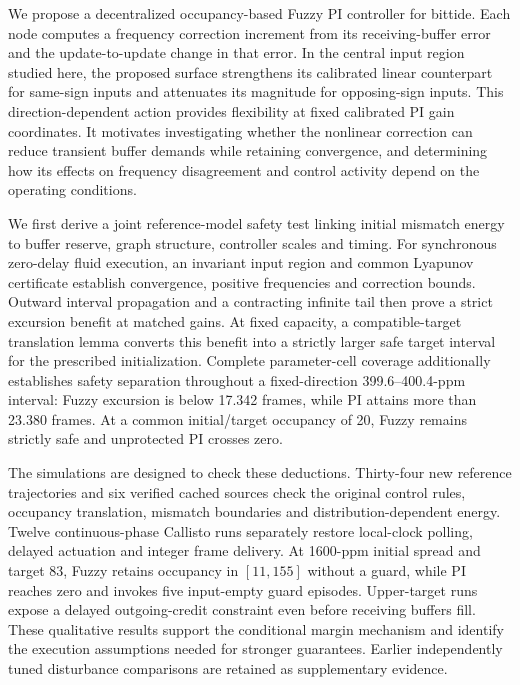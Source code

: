 We propose a decentralized occupancy-based Fuzzy PI controller for bittide. Each node computes a frequency correction increment from its receiving-buffer error and the update-to-update change in that error. In the central input region studied here, the proposed surface strengthens its calibrated linear counterpart for same-sign inputs and attenuates its magnitude for opposing-sign inputs. This direction-dependent action provides flexibility at fixed calibrated PI gain coordinates. It motivates investigating whether the nonlinear correction can reduce transient buffer demands while retaining convergence, and determining how its effects on frequency disagreement and control activity depend on the operating conditions.

We first derive a joint reference-model safety test linking initial mismatch energy to buffer reserve, graph structure, controller scales and timing. For synchronous zero-delay fluid execution, an invariant input region and common Lyapunov certificate establish convergence, positive frequencies and correction bounds. Outward interval propagation and a contracting infinite tail then prove a strict excursion benefit at matched gains. At fixed capacity, a compatible-target translation lemma converts this benefit into a strictly larger safe target interval for the prescribed initialization. Complete parameter-cell coverage additionally establishes safety separation throughout a fixed-direction 399.6--400.4-ppm interval: Fuzzy excursion is below 17.342 frames, while PI attains more than 23.380 frames. At a common initial/target occupancy of 20, Fuzzy remains strictly safe and unprotected PI crosses zero.

The simulations are designed to check these deductions. Thirty-four new reference trajectories and six verified cached sources check the original control rules, occupancy translation, mismatch boundaries and distribution-dependent energy. Twelve continuous-phase Callisto runs separately restore local-clock polling, delayed actuation and integer frame delivery. At 1600-ppm initial spread and target 83, Fuzzy retains occupancy in $[11,155]$ without a guard, while PI reaches zero and invokes five input-empty guard episodes. Upper-target runs expose a delayed outgoing-credit constraint even before receiving buffers fill. These qualitative results support the conditional margin mechanism and identify the execution assumptions needed for stronger guarantees. Earlier independently tuned disturbance comparisons are retained as supplementary evidence.

